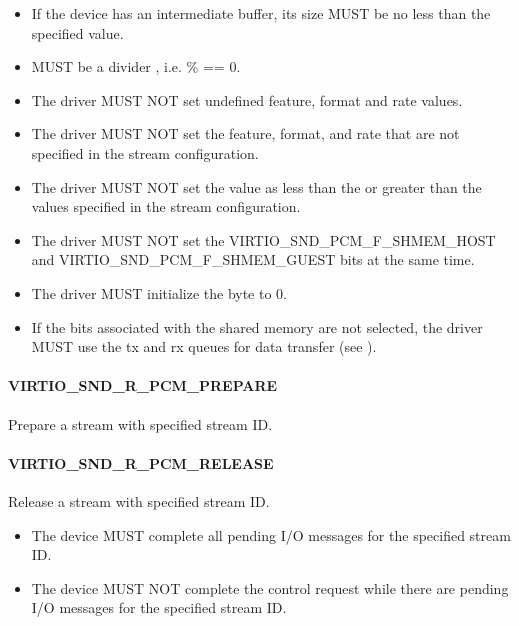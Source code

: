 \begin{itemize}
\item If the device has an intermediate buffer, its size MUST be no less than
the specified  value.
\end{itemize}


\begin{itemize}
\item {} MUST be a divider , i.e.  \%  == 0.
\item The driver MUST NOT set undefined feature, format and rate values.
\item The driver MUST NOT set the feature, format, and rate that are not specified
in the stream configuration.
\item The driver MUST NOT set the  value as less than the 
or greater than the  values specified in the stream configuration.
\item The driver MUST NOT set the VIRTIO_SND_PCM_F_SHMEM_HOST and VIRTIO_SND_PCM_F_SHMEM_GUEST
bits at the same time.
\item The driver MUST initialize the  byte to 0.
\item If the bits associated with the shared memory are not selected, the driver
MUST use the tx and rx queues for data transfer
(see ).
\end{itemize}

\paragraph{VIRTIO_SND_R_PCM_PREPARE}

Prepare a stream with specified stream ID.

\paragraph{VIRTIO_SND_R_PCM_RELEASE}

Release a stream with specified stream ID.


\begin{itemize}
\item The device MUST complete all pending I/O messages for the specified
stream ID.
\item The device MUST NOT complete the control request while there are pending
I/O messages for the specified stream ID.
\end{itemize}

